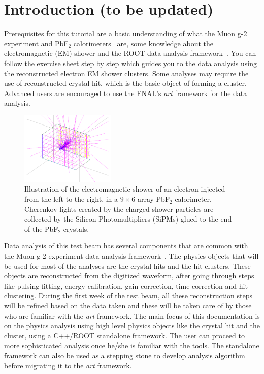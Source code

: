 \chapter{Introduction (to be updated)}
\label{chap:intro}

Prerequisites for this tutorial are a basic understanding of what the Muon g-2 experiment and PbF$_2$ calorimeters~\cite{Fienberg2015} are, some knowledge about the electromagnetic (EM) shower and the ROOT data analysis framework~\cite{ROOT}. You can follow the exercise sheet step by step which guides you to the data analysis using the reconstructed electron EM shower clusters. Some analyses may require the use of reconstructed crystal hit, which is the basic object of forming a cluster. Advanced users are encouraged to use the FNAL's \textit{art} framework for the data analysis.
%
\begin{figure}[htbp]
\centering
\includegraphics[trim=3cm 1cm 3cm 0cm, width=0.4\textwidth]{pics/EMShower.pdf}
\caption{Illustration of the electromagnetic shower of an electron injected from the left to the right, in a $9\times6$ array PbF$_2$ calorimeter. Cherenkov lights created by the charged shower particles are collected by the Silicon Photomultipliers (SiPMs) glued to the end of the PbF$_2$ crystals.}
\end{figure}

Data analysis of this test beam has several components that are common with the Muon g-2 experiment data analysis framework~\cite{Khaw2016}. The physics objects that will be used for most of the analyses are the crystal hits and the hit clusters.
These objects are reconstructed from the digitized waveform, after going through steps like pulsing fitting, energy calibration, gain correction, time correction and hit clustering. During the first week of the test beam, all these reconstruction steps
will be refined based on the data taken and these will be taken care of by those who are familiar with the \textit{art} framework. The main focus of this documentation is on the physics analysis using high level physics objects like the crystal hit and the cluster, using a C++/ROOT standalone framework. The user can proceed to more sophisticated analysis once he/she is familiar with the tools. The standalone framework can also be used as a stepping stone to develop analysis algorithm before migrating it to the \textit{art} framework.

